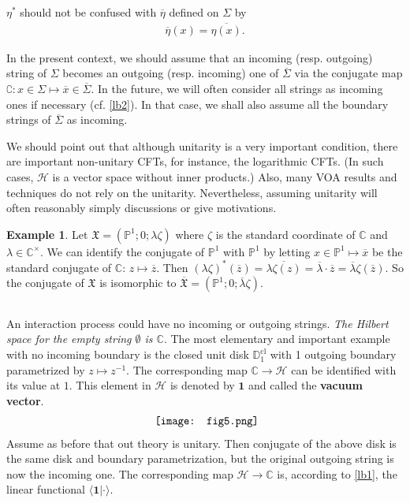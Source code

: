 \documentclass[12pt,a4paper,notitlepage]{article}
\theoremstyle{definition}
\newtheorem{eg}[df]{Example}
\theoremstyle{plain}
\newcommand{\fk}{\mathfrak}
\newcommand{\mc}{\mathcal}
\newcommand{\ovl}{\overline}
\newcommand{\id}{\mathbf{1}}
\newcommand{\bk}[1]{\langle {#1}\rangle}
\newcommand{\Co}{\complement}
\newcommand{\Cbb}{\mathbb C}
\newcommand{\Pbb}{\mathbb P}
\newcommand{\Dbb}{\mathbb D}
\newcommand{\cl}{\mathrm{cl}}
\numberwithin{equation}{section}
\begin{document}
$\eta^*$ should not be confused with $\ovl \eta$ defined on $\Sigma$ by
\begin{align*}
\ovl \eta(x)=\ovl{\eta(x)}.
\end{align*}



In the present context, we should assume that an incoming (resp. outgoing) string of $\Sigma$ becomes an outgoing (resp. incoming) one of $\ovl\Sigma$ via the conjugate map $\Co:x\in \Sigma\mapsto\ovl x\in\ovl\Sigma$. In the future, we will often consider all strings as incoming ones if necessary (cf. \ref{lb2}). In that case, we shall also assume all the boundary strings of $\ovl\Sigma$ as incoming.

We should point out that although unitarity is a very important condition, there are important non-unitary CFTs, for instance, the logarithmic CFTs. (In such cases, $\mc H$ is a vector space without inner products.) Also, many VOA results and techniques do not rely on the unitarity. Nevertheless, assuming unitarity will often reasonably simply discussions or give motivations.


\begin{eg}
Let $\fk X=(\Pbb^1;0;\lambda \zeta)$ where $\zeta$ is the standard coordinate of $\Cbb$ and $\lambda\in\Cbb^\times$. We can identify the conjugate of $\Pbb^1$ with $\Pbb^1$ by letting $x\in\Pbb^1\mapsto \ovl x$ be the standard conjugate of $\Cbb$: $z\mapsto \ovl z$. Then $(\lambda\zeta)^*(\ovl z)=\ovl{\lambda\zeta(z)}=\ovl\lambda\cdot\ovl z=\ovl\lambda\zeta(\ovl z)$. So the conjugate of $\fk X$ is isomorphic to $\ovl{\fk X}=(\Pbb^1;0;\ovl\lambda\zeta)$.	
\end{eg}	




\subsection{}\label{lb23}

An interaction process could have no incoming or outgoing strings. \emph{The Hilbert space for the empty string $\emptyset$ is $\Cbb$}. The most elementary and important example with no incoming boundary is the closed unit  disk $\Dbb_1^\cl$ with 1 outgoing boundary parametrized by $z\mapsto z^{-1}$. The corresponding map $\Cbb\rightarrow \mc H$ can be identified with its value at $1$. This element in $\mc H$ is denoted by $\id$ \index{1@$\id$, the vacuum vector} and called the \textbf{vacuum vector}.
\begin{align}
	\vcenter{\hbox{{
				\texttt{[image: fig5.png]}}}}\label{eq27}
\end{align}
Assume as before that out theory is unitary. Then conjugate of the above disk is the same disk and boundary parametrization, but the original outgoing string is now the incoming one. The corresponding map $\mc H\rightarrow \Cbb$ is, according to \ref{lb1}, the linear functional $\bk{\id|\cdot}$. 
\end{document}
